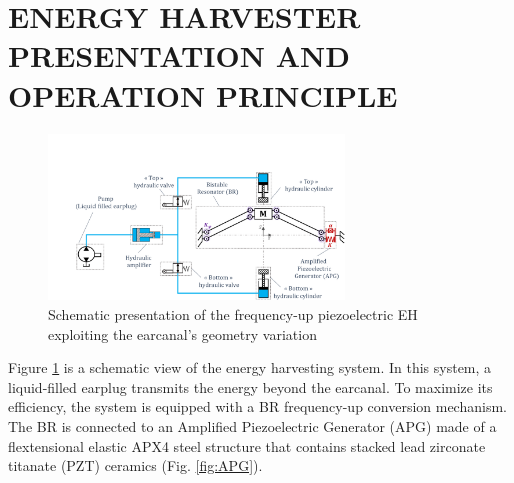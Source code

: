 \documentclass[3p,twocolumn,preprint]{elsarticle}
\begin{document}
\section{ENERGY HARVESTER PRESENTATION AND OPERATION \mbox{PRINCIPLE}}
\label{sec:HARVESTER PRESENTATION AND OPERATION PRINCIPLE}
\begin{figure}[!htbp]
	\centering
	\captionsetup{justification=centering}
	\includegraphics[trim={3.2cm 0cm 0cm 4.3cm},clip, width=0.7\textwidth]{figures/system_presentation.pdf}
	\caption{Schematic presentation of the frequency-up piezoelectric EH exploiting the earcanal's geometry variation} 
	\label{fig:system_presentation}
\end{figure}
Figure \ref{fig:system_presentation} is a schematic view of the energy harvesting system. In this system, a liquid-filled earplug transmits the energy beyond the earcanal. To maximize its efficiency, the system is equipped with a BR frequency-up conversion mechanism. The BR is connected to an Amplified Piezoelectric Generator (APG) \cite{CEDRATTECHNOLOGIES2022} made of a flextensional elastic APX4 steel \cite{AUBERT&DUVAL2022} structure that contains stacked lead zirconate titanate (PZT) ceramics (Fig. \ref{fig:APG}).
\end{document}
